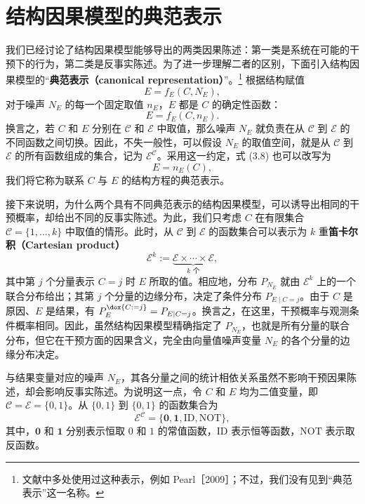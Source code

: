 \section{结构因果模型的典范表示}
\label{sec:ch03-canonical}

我们已经讨论了结构因果模型能够导出的两类因果陈述：第一类是系统在可能的干预下的行为，第二类是反事实陈述。为了进一步理解二者的区别，下面引入结构因果模型的“\textbf{典范表示（canonical representation）}”。\footnote{文献中多处使用过这种表示，例如 Pearl［2009］；不过，我们没有见到“典范表示”这一名称。}
根据结构赋值
\[
 E=f_E(C,N_E),
\]
对于噪声 $N_E$ 的每一个固定取值 $n_E$，$E$ 都是 $C$ 的确定性函数：
\begin{equation}
 E=f_E(C,n_E).
 \tag{3.8}
\end{equation}
换言之，若 $C$ 和 $E$ 分别在 $\mathcal{C}$ 和 $\mathcal{E}$ 中取值，那么噪声 $N_E$ 就负责在从 $\mathcal{C}$ 到 $\mathcal{E}$ 的不同函数之间切换。因此，不失一般性，可以假设 $N_E$ 的取值空间，就是从 $\mathcal{C}$ 到 $\mathcal{E}$ 的所有函数组成的集合，记为 $\mathcal{E}^{\mathcal{C}}$。采用这一约定，式 (3.8) 也可以改写为
\begin{equation}
 E=n_E(C),
 \tag{3.9}
\end{equation}
我们将它称为联系 $C$ 与 $E$ 的结构方程的典范表示。

接下来说明，为什么两个具有不同典范表示的结构因果模型，可以诱导出相同的干预概率，却给出不同的反事实陈述。为此，我们只考虑 $C$ 在有限集合 $\mathcal{C}=\{1,\ldots,k\}$ 中取值的情形。此时，从 $\mathcal{C}$ 到 $\mathcal{E}$ 的函数集合可以表示为 $k$ 重\textbf{笛卡尔积（Cartesian product）}
\[
 \mathcal{E}^k:=\underbrace{\mathcal{E}\times\cdots\times\mathcal{E}}_{k\text{ 个}},
\]
其中第 $j$ 个分量表示 $C=j$ 时 $E$ 所取的值。相应地，分布 $P_{N_E}$ 就由 $\mathcal{E}^k$ 上的一个联合分布给出；其第 $j$ 个分量的边缘分布，决定了条件分布 $P_{E\mid C=j}$。由于 $C$ 是原因、$E$ 是结果，有 $P_E^{\dox{C:=j}}=P_{E\mid C=j}$。换言之，在这里，干预概率与观测条件概率相同。因此，虽然结构因果模型精确指定了 $P_{N_E}$，也就是所有分量的联合分布，但它在干预方面的因果含义，完全由向量值噪声变量 $N_E$ 的各个分量的边缘分布决定。

与结果变量对应的噪声 $N_E$，其各分量之间的统计相依关系虽然不影响干预因果陈述，却会影响反事实陈述。为说明这一点，令 $C$ 和 $E$ 均为二值变量，即 $\mathcal{C}=\mathcal{E}=\{0,1\}$。从 $\{0,1\}$ 到 $\{0,1\}$ 的函数集合为
\[
 \mathcal{E}^{\mathcal{C}}=\{\mathbf{0},\mathbf{1},\mathrm{ID},\mathrm{NOT}\},
\]
其中，$\mathbf{0}$ 和 $\mathbf{1}$ 分别表示恒取 $0$ 和 $1$ 的常值函数，$\mathrm{ID}$ 表示恒等函数，$\mathrm{NOT}$ 表示取反函数。

